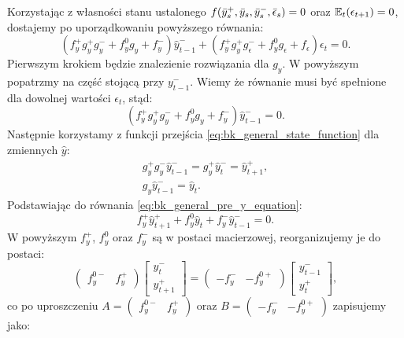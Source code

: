 Korzystając z własności stanu ustalonego $f(\bar{y}_s^+, \bar{y}_s, \bar{y}_s^-, \bar{\epsilon}_s) = 0$ oraz $\mathbb{E}_t(\epsilon_{t+1}) = 0$, dostajemy po uporządkowaniu powyższego równania:
\begin{equation}
    \label{eqn:genericBkMainEq}
    (f_y^+ g_y^+ g_y^- + f_y^0 g_y + f_y^-) \hat{y}^-_{t-1} + (f_y^+ g_y^+ g_\epsilon^- + f_y^0 g_\epsilon + f_\epsilon) \epsilon_t = 0.
\end{equation}
Pierwszym krokiem będzie znalezienie rozwiązania dla $g_y$. W powyższym popatrzmy na część stojącą przy $y^-_{t-1}$. Wiemy że równanie musi być spełnione dla dowolnej wartości $\epsilon_t$, stąd:
\begin{equation}
    \label{eq:bk_general_pre_y_equation}
    (f_y^+ g_y^+ g_y^- + f_y^0 g_y + f_y^-)\hat{y}^-_{t-1} = 0.
\end{equation}
Następnie korzystamy z funkcji przejścia \eqref{eq:bk_general_state_function} dla zmiennych $\hat{y}$:
\begin{gather}
    g_y^+ g_y^- \hat{y}^-_{t-1} = g_y^+\hat{y}^-_{t} = \hat{y}^+_{t+1}, \\
    g_y \hat{y}^-_{t-1} = \hat{y}_t.
\end{gather}
Podstawiając do równania \eqref{eq:bk_general_pre_y_equation}:
\begin{equation}
    \label{eqn:genericBkGy}
    f_y^+ \hat{y}^+_{t+1} + f_y^0 \hat{y}_t + f_y^- \hat{y}^-_{t-1} = 0.
\end{equation}
W powyższym $f_y^+$, $f_y^0$ oraz $f_y^-$ są w postaci macierzowej, reorganizujemy je do postaci:
\begin{equation}
    \label{eqn:genBkMatrixGy}
    \begin{pmatrix}
        f_y^{0-} & f_y^+
    \end{pmatrix}
    \begin{bmatrix}
        y_t^- \\
        y_{t+1}^+
    \end{bmatrix} = 
        \begin{pmatrix}
        -f_y^{-} & -f_y^{0+}
    \end{pmatrix}
    \begin{bmatrix}
        y_{t-1}^- \\
        y_{t}^+
    \end{bmatrix},
\end{equation}
co po uproszczeniu $A = \begin{pmatrix}f_y^{0-} & f_y^+\end{pmatrix}$ oraz $B = \begin{pmatrix} -f_y^{-} & -f_y^{0+}\end{pmatrix}$ zapisujemy jako:
